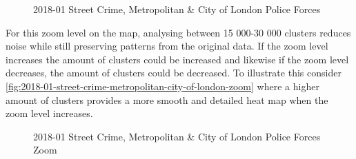\documentclass[main.tex]{subfiles}
\begin{document}
\begin{figure}[H]
    \caption{2018-01 Street Crime, Metropolitan \& City of London Police Forces}
    \label{fig:2018-01-street-crime-metropolitan-city-of-london}
\end{figure}

For this zoom level on the map, analysing between 15 000-30 000 clusters reduces noise while still preserving patterns from the original data. If the zoom level increases the amount of clusters could be increased and likewise if the zoom level decreases, the amount of clusters could be decreased. To illustrate this consider \autoref{fig:2018-01-street-crime-metropolitan-city-of-london-zoom} where a higher amount of clusters provides a more smooth and detailed heat map when the zoom level increases.

\begin{figure}[H]
    \centering
    \caption{2018-01 Street Crime, Metropolitan \& City of London Police Forces Zoom}
    \label{fig:2018-01-street-crime-metropolitan-city-of-london-zoom}
\end{figure}
\end{document}
